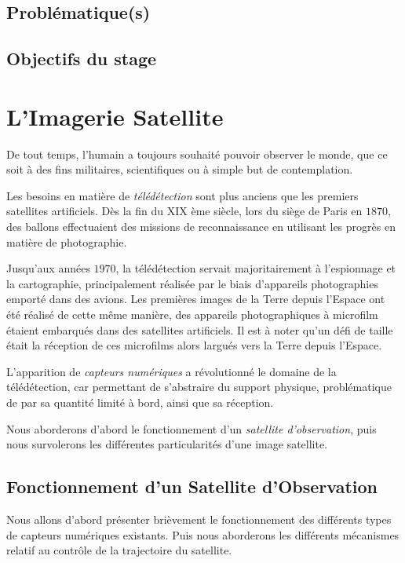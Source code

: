 \documentclass[a4paper, 10pt]{report}
\begin{document}
\section{Problématique(s)}
\section{Objectifs du stage}
\chapter{L'Imagerie Satellite}
De tout temps, l'humain a toujours souhaité pouvoir observer le monde, que ce soit à des fins militaires, scientifiques ou à simple but de contemplation.

Les besoins en matière de \emph{télédétection} sont plus anciens que les premiers satellites artificiels. Dès la fin du XIX ème siècle, lors du siège de Paris en $1870$, des ballons effectuaient des missions de reconnaissance en utilisant les progrès en matière de photographie.

Jusqu'aux années $1970$, la télédétection servait majoritairement à l'espionnage et la cartographie, principalement réalisée par le biais d'appareils photographies emporté dans des avions.
Les premières images de la Terre depuis l'Espace ont été réalisé de cette même manière, des appareils photographiques à microfilm étaient embarqués dans des satellites artificiels. Il est à noter qu'un défi de taille était la réception de ces microfilms alors largués vers la Terre depuis l'Espace.

L'apparition de \emph{capteurs numériques} a révolutionné le domaine de la télédétection, car permettant de s'abstraire du support physique, problématique de par sa quantité limité à bord, ainsi que sa réception.

Nous aborderons d'abord le fonctionnement d'un \emph{satellite d'observation}, puis nous survolerons les différentes particularités d'une image satellite.
\section{Fonctionnement d'un Satellite d'Observation}
Nous allons d'abord présenter brièvement le fonctionnement des différents types de capteurs numériques existants.
Puis nous aborderons les différents mécanismes relatif au contrôle de la trajectoire du satellite.
\end{document}
